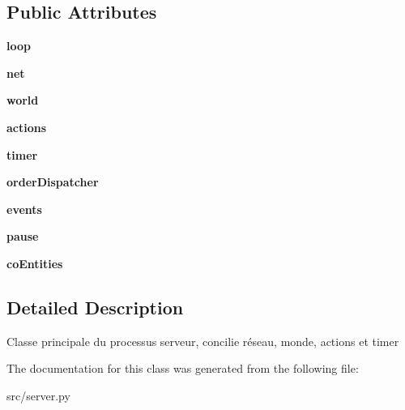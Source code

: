 \subsection*{\-Public \-Attributes}
\begin{DoxyCompactItemize}
\item 
\hypertarget{classsrc_1_1server_1_1_server_a8d98a3996ae2b6b38a15b8a50398358a}{{\bfseries loop}}\label{classsrc_1_1server_1_1_server_a8d98a3996ae2b6b38a15b8a50398358a}

\item 
\hypertarget{classsrc_1_1server_1_1_server_a977f367c00160406f296db24527ca2e4}{{\bfseries net}}\label{classsrc_1_1server_1_1_server_a977f367c00160406f296db24527ca2e4}

\item 
\hypertarget{classsrc_1_1server_1_1_server_a81234f26dc57f2224a44ae02da905c35}{{\bfseries world}}\label{classsrc_1_1server_1_1_server_a81234f26dc57f2224a44ae02da905c35}

\item 
\hypertarget{classsrc_1_1server_1_1_server_add29ef3b0aee842a0d8f853b2ea26ad2}{{\bfseries actions}}\label{classsrc_1_1server_1_1_server_add29ef3b0aee842a0d8f853b2ea26ad2}

\item 
\hypertarget{classsrc_1_1server_1_1_server_a206063d33409432177c439e974f86b56}{{\bfseries timer}}\label{classsrc_1_1server_1_1_server_a206063d33409432177c439e974f86b56}

\item 
\hypertarget{classsrc_1_1server_1_1_server_afcc520c8d960ee0208dd35d6e4f68dfe}{{\bfseries order\-Dispatcher}}\label{classsrc_1_1server_1_1_server_afcc520c8d960ee0208dd35d6e4f68dfe}

\item 
\hypertarget{classsrc_1_1server_1_1_server_ab7c18709ca5293c140d26000f3828ecc}{{\bfseries events}}\label{classsrc_1_1server_1_1_server_ab7c18709ca5293c140d26000f3828ecc}

\item 
\hypertarget{classsrc_1_1server_1_1_server_a258b521a9c27ccb466ee0150f527855f}{{\bfseries pause}}\label{classsrc_1_1server_1_1_server_a258b521a9c27ccb466ee0150f527855f}

\item 
\hypertarget{classsrc_1_1server_1_1_server_ad4915e7ccfa002a475ca6bdb77c457c4}{{\bfseries co\-Entities}}\label{classsrc_1_1server_1_1_server_ad4915e7ccfa002a475ca6bdb77c457c4}

\end{DoxyCompactItemize}


\subsection{\-Detailed \-Description}
\begin{DoxyVerb}Classe principale du processus serveur, concilie réseau, monde, actions et timer \end{DoxyVerb}
 

\-The documentation for this class was generated from the following file\-:\begin{DoxyCompactItemize}
\item 
src/server.\-py\end{DoxyCompactItemize}
